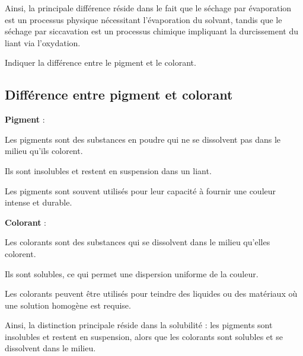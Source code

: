 \documentclass[answers]{exam}
\begin{document}
\begin{questions}
\begin{solution}
Ainsi, la principale différence réside dans le fait que le séchage par évaporation est un processus physique nécessitant l'évaporation du solvant, tandis que le séchage par siccavation est un processus chimique impliquant la durcissement du liant via l'oxydation.

\end{solution}

\question[2] Indiquer la différence entre le pigment et le colorant.

  \end{questions}



\begin{solution}

\subsection*{Différence entre pigment et colorant}

\begin{compactitem}
    \item \textbf{Pigment} : 
    \begin{compactitem}
        \item Les pigments sont des substances en poudre qui ne se dissolvent pas dans le milieu qu'ils colorent.
        \item Ils sont insolubles et restent en suspension dans un liant.
        \item Les pigments sont souvent utilisés pour leur capacité à fournir une couleur intense et durable.
    \end{compactitem}
    
    \item \textbf{Colorant} :
    \begin{compactitem}
        \item Les colorants sont des substances qui se dissolvent dans le milieu qu'elles colorent.
        \item Ils sont solubles, ce qui permet une dispersion uniforme de la couleur.
        \item Les colorants peuvent être utilisés pour teindre des liquides ou des matériaux où une solution homogène est requise.
    \end{compactitem}
\end{compactitem}

Ainsi, la distinction principale réside dans la solubilité : les pigments sont insolubles et restent en suspension, alors que les colorants sont solubles et se dissolvent dans le milieu.

\end{solution}
\end{document}
